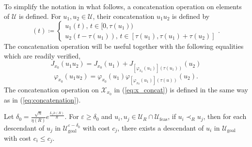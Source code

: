 \documentclass{llncs}
\begin{document}
To simplify the notation in what follows, a concatenation operation on elements of $\mathcal{U}$ is defined.
For $u_{1},u_{2}\in\mathcal{U}$, their concatenation $u_{1}u_{2}$
is defined by 
\begin{equation}
[u_{1}u_{2}](t)\coloneqq\left\{ \begin{array}{c}
u_{1}(t),\, t\in[0,\tau(u_{1}))\\
u_{2}(t-\tau(u_{1})),\, t\in[\tau(u_{1}),\tau(u_{1})+\tau(u_{2})]
\end{array}\right..\label{eq:concatenation}
\end{equation}
%
The concatenation operation will be useful together
with the following equalities which are readily verified, 
\begin{equation}\label{eq:cost_homo}
J_{x_{0}}(u_{1}u_{2})=J_{x_{0}}(u_{1})+J_{[\varphi_{x_0}(u_1)](\tau(u_1))}(u_{2})
\end{equation}
\begin{equation}
\ensuremath{\varphi_{x_{0}}(u_{1}u_{2})=\varphi_{x_{0}}(u_{1})\varphi_{[\varphi_{x_{0}}(u_1)](\tau(u))}(u_{2})}.\label{eq:x_concat}
\end{equation}
The concatenation operation on $\mathcal{X}_{x_{0}}$ in (\ref{eq:x_concat})
is defined in the same way as in (\ref{eq:concatenation}). 
\begin{lemma}
\label{lem:pruning}Let $\delta_0=\frac{\sqrt{n}}{\eta(R)}e^{\frac{L_{f}h(R)}{R}}$.
For $\varepsilon\geq \delta_0$ and $u_{i},u_{j}\in\mathcal{U}_{R}\cap\mathcal{U}_\mathrm{feas}$, if
$u_{i}\prec_{R}u_{j}$, then for each descendant of $u_{j}$ in $\mathcal{U}_\mathrm{goal}^{\varepsilon-\delta_0}$
with cost $c_{j}$, there exists a descendant of $u_{i}$ in $\mathcal{U}_\mathrm{goal}$
with cost $c_{i}\leq c_{j}$.\end{lemma}
\end{document}
